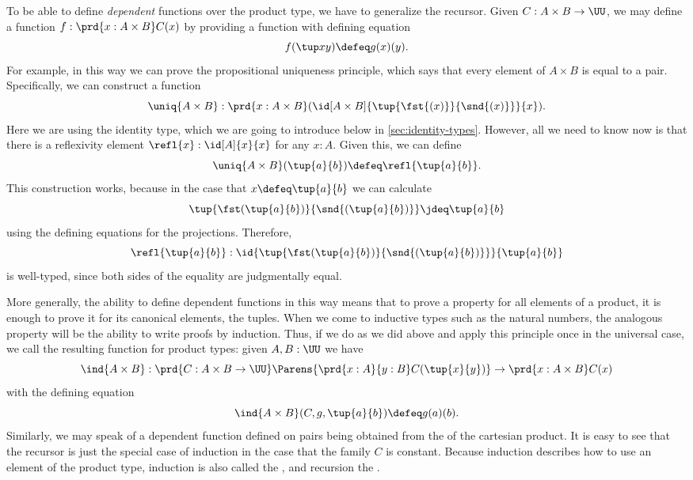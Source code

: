 To be able to define \emph{dependent} functions over the product type, we have
to generalize the recursor. Given $C: A \times B \to \UU$, we may
define a function $f : \prd{x : A \times B} C(x)$ by providing a
function
with defining equation
\[ f(\tup x y) \defeq g(x)(y). \] 
For example, in this way we can prove the propositional uniqueness principle, which says that every element of $A\times B$ is equal to a pair.
%
Specifically, we can construct a function
\[ \uniq{A\times B} : \prd{x:A \times B} (\id[A\times B]{\tup{\fst {(x)}}{\snd {(x)}}}{x}). \]
Here we are using the identity type, which we are going to introduce below in \cref{sec:identity-types}.
However, all we need to know now is that there is a reflexivity element $\refl{x} : \id[A]{x}{x}$ for any $x:A$.
Given this, we can define
\label{uniquenessproduct}
\[ \uniq{A\times B}(\tup{a}{b}) \defeq \refl{\tup{a}{b}}. \]
This construction works, because in the case that $x \defeq \tup{a}{b}$ we can 
calculate 
\[ \tup{\fst(\tup{a}{b})}{\snd{(\tup{a}{b})}} \jdeq \tup{a}{b} \]
using the defining equations for the projections. Therefore,
\[ \refl{\tup{a}{b}} : \id{\tup{\fst(\tup{a}{b})}{\snd{(\tup{a}{b})}}}{\tup{a}{b}} \]
is well-typed, since both sides of the equality are judgmentally equal.

More generally, the ability to define dependent functions in this way means that to prove a property for all elements of a product, it is enough 
to prove it for its canonical elements, the tuples.
When we come to inductive types such as the natural numbers, the analogous property will be the ability to write proofs by induction.
Thus, if we do as we did above and apply this principle once in the universal case, we call the resulting function  for product types: given $A,B : \UU$ we have
%
\[ \ind{A\times B} : \prd{C:A \times B \to \UU}
\Parens{\prd{x:A}{y:B} C(\tup{x}{y})} \to \prd{x:A \times B} C(x) \]
with the defining equation 
\[ \ind{A\times B}(C,g,\tup{a}{b}) \defeq g(a)(b). \]
Similarly, we may speak of a dependent function defined on pairs being obtained from the 
%
%
of the cartesian product.
It is easy to see that the recursor is just the special case of induction
in the case that the family $C$ is constant.
Because induction describes how to use an element of the product type, induction is also called the ,
%
and recursion the .
%
%
%

